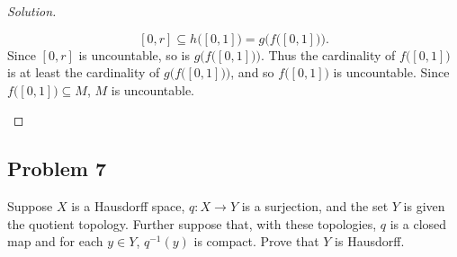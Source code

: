 \documentclass[12pt]{article}
\newcommand\inv[1]{#1^{-1}}
\theoremstyle{definition}
\begin{document}
\begin{proof}[Solution]
\begin{enumerate}[a)]
        \[
            [0,r] \subseteq h \big( [0,1] \big) = g \Big( f \big( [0,1] \big) \Big).
        \]
        Since $[0,r]$ is uncountable, so is $g \Big( f \big( [0,1] \big) \Big)$. Thus the cardinality of $f \big( [0,1] \big)$ is at least the cardinality of $g \Big( f \big( [0,1] \big) \Big)$, and so $f \big( [0,1] \big)$ is uncountable. Since $f \big( [0,1] \big) \subseteq M$, $M$ is uncountable.
    \end{enumerate}
\end{proof}
\subsection{Problem 7 \texorpdfstring{\cite{Munkres,Jacob}}{}}
Suppose $X$ is a Hausdorff space, $q : X \to Y$ is a surjection, and the set $Y$ is given the quotient topology. Further suppose that, with these topologies, $q$ is a closed map and for each $y \in Y$, $\inv{q}(y)$ is compact. Prove that $Y$ is Hausdorff.
\end{document}

